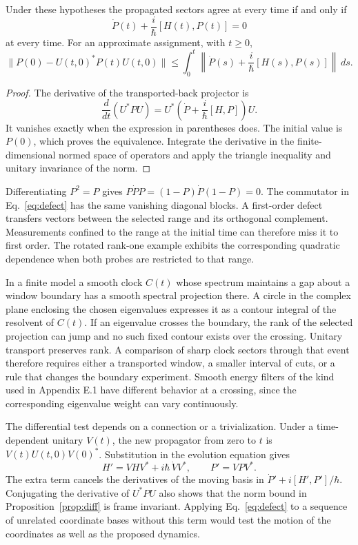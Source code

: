 \documentclass[11pt,letterpaper]{article}
\begin{document}
\begin{proposition}
\label{prop:diff}
Under these hypotheses the propagated sectors agree at every time if
and only if
\begin{equation}
 \dot P(t)+\frac{i}{\hbar}[H(t),P(t)]=0
 \label{eq:defect}
\end{equation}
at every time. For an approximate assignment, with \(t\ge0\),
\[
 \|P(0)-U(t,0)^*P(t)U(t,0)\|
 \leq \int_0^t
 \left\|\dot P(s)+\frac{i}{\hbar}[H(s),P(s)]\right\|\,ds .
\]
\end{proposition}
\begin{proof}
The derivative of the transported-back projector is
\[
 \frac d{dt}(U^*P U)=U^*
 \left(\dot P+\frac{i}{\hbar}[H,P]\right)U.
\]
It vanishes exactly when the expression in parentheses does.
The initial value is \(P(0)\), which proves the equivalence.
Integrate the derivative in the finite-dimensional normed space of
operators and apply the triangle inequality and unitary invariance of
the norm.
\end{proof}

Differentiating \(P^2=P\) gives
\(P\dot P P=(1-P)\dot P(1-P)=0\). The commutator in
Eq.~\eqref{eq:defect} has the same vanishing diagonal blocks.
A first-order defect transfers vectors between the selected range and
its orthogonal complement. Measurements confined to the range at the
initial time can therefore miss it to first order. The rotated
rank-one example exhibits the corresponding quadratic dependence when
both probes are restricted to that range.

In a finite model a smooth clock \(C(t)\) whose spectrum maintains a gap
about a window boundary has a smooth spectral projection there. A circle
in the complex plane enclosing the chosen eigenvalues expresses it as a
contour integral of the resolvent of \(C(t)\). If an eigenvalue crosses
the boundary, the rank of the selected projection can jump and no such
fixed contour exists over the crossing. Unitary transport preserves rank.
A comparison of sharp clock sectors through that event therefore requires
either a transported window, a smaller interval of cuts, or a rule that
changes the boundary experiment. Smooth energy filters of the kind used
in Appendix E.1 have different behavior at a crossing, since the
corresponding eigenvalue weight can vary continuously.

The differential test depends on a connection or a trivialization.
Under a time-dependent unitary \(V(t)\), the new propagator from zero to
\(t\) is \(V(t)U(t,0)V(0)^*\).
Substitution in the evolution equation gives
\[
 H'=VHV^*+i\hbar\,\dot V V^*,\qquad P'=VPV^* .
\]
The extra term cancels the derivatives of the moving basis in
\(\dot P'+i[H',P']/\hbar\). Conjugating the derivative
of \(U^*P U\) also shows that the norm bound in Proposition~\ref{prop:diff} is
frame invariant. Applying Eq.~\eqref{eq:defect} to a sequence of
unrelated coordinate bases without this term would test the motion of
the coordinates as well as the proposed dynamics.
\end{document}

